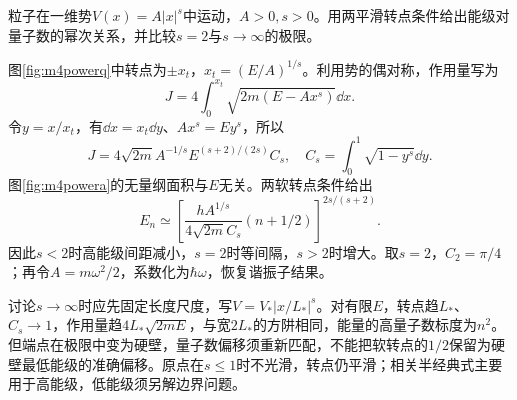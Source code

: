 \begin{exercise}\label{ex:m4powerwell}
粒子在一维势$V(x)=A|x|^s$中运动，$A>0,s>0$。用两平滑转点条件给出能级对量子数的幂次关系，并比较$s=2$与$s\to\infty$的极限。
\end{exercise}
\begin{solution}
图\ref{fig:m4powerq}中转点为$\pm x_t$，$x_t=(E/A)^{1/s}$。利用势的偶对称，作用量写为
\[
 J=4\int_0^{x_t}\sqrt{2m(E-Ax^s)}\dd x.
\]
令$y=x/x_t$，有$\dd x=x_t\dd y$、$Ax^s=Ey^s$，所以
\[
 J=4\sqrt{2m}A^{-1/s}E^{(s+2)/(2s)}C_s,\quad
 C_s=\int_0^1\sqrt{1-y^s}\dd y.
\]
图\ref{fig:m4powera}的无量纲面积与$E$无关。两软转点条件给出
\[
 E_n\simeq\left[\frac{hA^{1/s}}{4\sqrt{2m}C_s}
 (n+1/2)\right]^{2s/(s+2)}.
\]
因此$s<2$时高能级间距减小，$s=2$时等间隔，$s>2$时增大。取$s=2$，$C_2=\pi/4$；再令$A=m\omega^2/2$，系数化为$\hbar\omega$，恢复谐振子结果。

讨论$s\to\infty$时应先固定长度尺度，写$V=V_*|x/L_*|^s$。对有限$E$，转点趋$L_*$、$C_s\to1$，作用量趋$4L_*\sqrt{2mE}$，与宽$2L_*$的方阱相同，能量的高量子数标度为$n^2$。但端点在极限中变为硬壁，量子数偏移须重新匹配，不能把软转点的$1/2$保留为硬壁最低能级的准确偏移。原点在$s\leq1$时不光滑，转点仍平滑；相关半经典式主要用于高能级，低能级须另解边界问题。
\end{solution}

